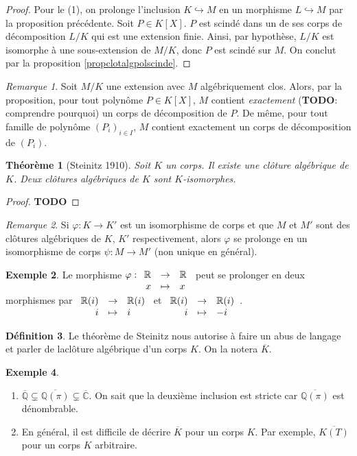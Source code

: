 \documentclass{article}
\newcommand{\Q}{\mathbb{Q}}
\newcommand{\Qbar}{\overline{\mathbb{Q}}}
\newcommand{\R}{\mathbb{R}}
\newcommand{\C}{\mathbb{C}}
\newcommand{\todo}{\textbf{TODO}}
\newcommand{\applic}[4]{\begin{array}[t]{rcl}
#1 & \to & #2 \\
#3 & \mapsto & #4
\end{array}}
\theoremstyle{plain}
\newtheorem{theorem}{Théorème}[subsection]
\theoremstyle{definition}
\newtheorem{definition}[theorem]{Définition}
\newtheorem{example}[theorem]{Exemple}
\theoremstyle{remark}
\newtheorem*{remark}{Remarque}
\begin{document}
\begin{proof}
    Pour le (1), on prolonge l'inclusion $K \hookrightarrow M$ en un morphisme $L \hookrightarrow M$ par la proposition précédente. Soit $P \in K[X]$. $P$ est scindé dans un de ses corps de décomposition $L/K$ qui est une extension finie. Ainsi, par hypothèse, $L/K$ est isomorphe à une sous-extension de $M/K$, donc $P$ est scindé sur $M$. On conclut par la proposition \ref{propclotalgpolscinde}.
\end{proof}

\begin{remark}
    Soit $M/K$ une extension avec $M$ algébriquement clos. Alors, par la proposition, pour tout polynôme $P \in K[X]$, $M$ contient \emph{exactement} (\todo : comprendre pourquoi) un corps de décomposition de $P$. De même, pour tout famille de polynôme $(P_i)_{i\in I}$, $M$ contient exactement un corps de décomposition de $(P_i)$.
\end{remark}

\begin{theorem}[Steinitz 1910]
    Soit $K$ un corps. Il existe une clôture algébrique de $K$. Deux clôtures algébriques de $K$ sont $K$-isomorphes.
\end{theorem}

\begin{proof}
    \todo
\end{proof}

\begin{remark}
    Si $\varphi : K \to K'$ est un isomorphisme de corps et que $M$ et $M'$ sont des clôtures algébriques de $K$, $K'$ respectivement, alors $\varphi$ se prolonge en un isomorphisme de corps $\psi : M \to M'$ (non unique en général).
\end{remark}

\begin{example}
    Le morphisme $\varphi : \applic{\R}{\R}{x}{x}$ peut se prolonger en deux morphismes par $\applic{\R(i)}{\R(i)}{i}{i}$ et $\applic{\R(i)}{\R(i)}{i}{-i}$.
\end{example}

\begin{definition}
    Le théorème de Steinitz nous autorise à faire un abus de langage et parler de \og la\fg clôture algébrique d'un corps $K$. On la notera $\overline{K}$.
\end{definition}

\begin{example} \leavevmode
    \begin{enumerate}
        \item $\Qbar \subsetneq \overline{\Q(\pi)} \subsetneq \overline{\C}$. On sait que la deuxième inclusion est stricte car $\overline{\Q(\pi)}$ est dénombrable.
        \item En général, il est difficile de décrire $\overline{K}$ pour un corps $K$. Par exemple, $\overline{K(T)}$ pour un corps $K$ arbitraire.
    \end{enumerate}
\end{example}
\end{document}
